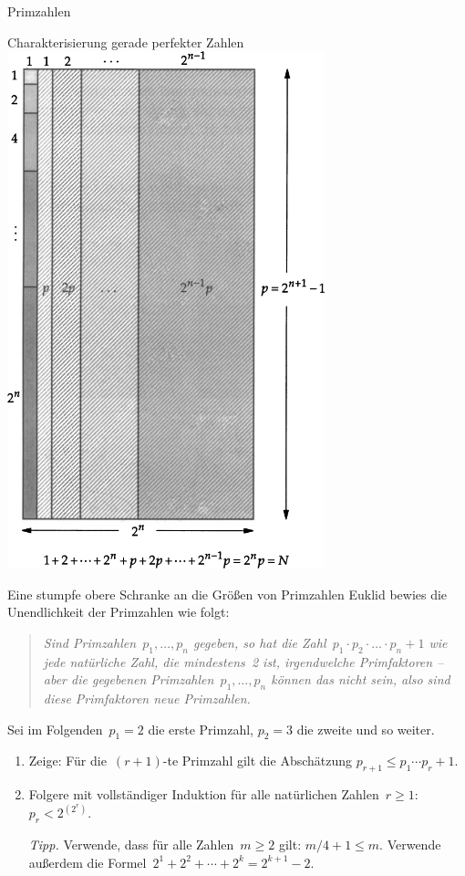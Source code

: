 \documentclass{uebblatt}
\begin{document}
\begin{blatt}{Primzahlen}
\begin{aufgabe}{Charakterisierung gerade perfekter Zahlen}
\centering\includegraphics[height=15cm]{mersenne-perfekt}
\end{aufgabe}

\begin{aufgabe}{Eine stumpfe obere Schranke an die Größen von Primzahlen}
Euklid bewies die Unendlichkeit der Primzahlen wie folgt:
\begin{quote}
\emph{Sind Primzahlen~$p_1,\ldots,p_n$ gegeben, so hat die Zahl~$p_1 \cdot p_2 \cdot \ldots \cdot p_n
+ 1$ wie jede natürliche Zahl, die mindestens~2 ist, irgendwelche Primfaktoren
-- aber die gegebenen Primzahlen~$p_1,\ldots,p_n$ können das nicht sein, also
sind diese Primfaktoren neue Primzahlen.}
\end{quote}
Sei im Folgenden~$p_1 = 2$ die erste Primzahl, $p_2 = 3$ die zweite und so
weiter.
\begin{enumerate}
\item Zeige: Für die~$(r+1)$-te Primzahl gilt die Abschätzung
$p_{r+1} \leq p_1 \cdots p_r + 1$.
\item Folgere mit vollständiger Induktion für alle natürlichen Zahlen~$r \geq 1$: $p_r < 2^{(2^r)}$.

{\scriptsize\emph{Tipp.} Verwende, dass für alle Zahlen~$m \geq 2$ gilt: $m/4 +
1 \leq m$. Verwende außerdem die Formel~$2^1 + 2^2 + \cdots + 2^k = 2^{k+1} -
2$.\par}
\end{enumerate}
\end{aufgabe}

\end{blatt}
\end{document}
